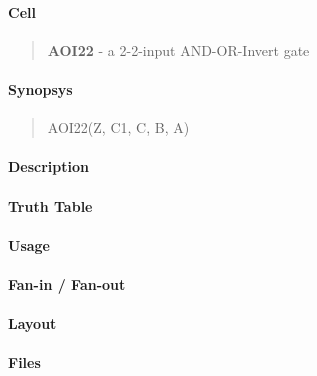 \label{AOI22}
\paragraph{Cell}
\begin{quote}
    \textbf{AOI22} - a 2-2-input AND-OR-Invert gate
\end{quote}

\paragraph{Synopsys}
\begin{quote}
    AOI22(Z, C1, C, B, A)
\end{quote}

\paragraph{Description}

%

\paragraph{Truth Table}
%

\paragraph{Usage}

\paragraph{Fan-in / Fan-out}

\paragraph{Layout}

\paragraph{Files}
